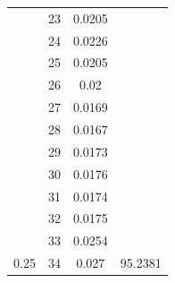 \documentclass{article}
\begin{document}
\begin{multicols}{2}
\begin{table}[H]
\begin{tabular}{|c|c|c|c|}
 & 23 & 0.0205 & \cellcolor[HTML]{FFFFC7} \\ \cline{2-3}
 & 24 & 0.0226 & \cellcolor[HTML]{FFFFC7} \\ \cline{2-3}
 & 25 & 0.0205 & \cellcolor[HTML]{FFFFC7} \\ \cline{2-3}
 & 26 & 0.02 & \cellcolor[HTML]{FFFFC7} \\ \cline{2-3}
 & 27 & 0.0169 & \cellcolor[HTML]{FFFFC7} \\ \cline{2-3}
 & 28 & 0.0167 & \cellcolor[HTML]{FFFFC7} \\ \cline{2-3}
 & 29 & 0.0173 & \cellcolor[HTML]{FFFFC7} \\ \cline{2-3}
 & 30 & 0.0176 & \cellcolor[HTML]{FFFFC7} \\ \cline{2-3}
 & 31 & 0.0174 & \cellcolor[HTML]{FFFFC7} \\ \cline{2-3}
 & 32 & 0.0175 & \cellcolor[HTML]{FFFFC7} \\ \cline{2-3}
 & 33 & 0.0254 & \cellcolor[HTML]{FFFFC7} \\ \cline{2-3}
\multirow{-35}{*}{0.25} & 34 & 0.027 & \multirow{-24}{*}{\cellcolor[HTML]{FFFFC7}95.2381} \\ \hline
\end{tabular}
\end{table}


\end{multicols}
\end{document}

